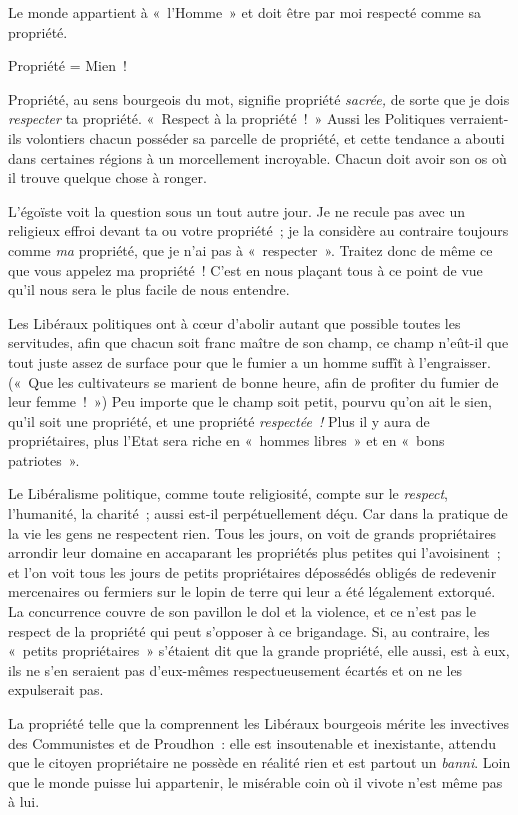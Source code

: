 \documentclass[french,twoside]{book} %
\begin{document}
Le monde appartient à « l’Homme » et doit être par moi respecté comme sa propriété.\par
Propriété = Mien !\par
Propriété, au sens bourgeois du mot, signifie propriété \emph{sacrée,} de sorte que je dois \emph{respecter} ta propriété. « Respect à la propriété ! » Aussi les Politiques verraient-ils volontiers chacun posséder sa parcelle de propriété, et cette tendance a abouti dans certaines régions à un morcellement incroyable. Chacun doit avoir son os où il trouve quelque chose à ronger.\par
L’égoïste voit la question sous un tout autre jour. Je ne recule pas avec un religieux effroi devant ta ou votre propriété ; je la considère au contraire toujours comme \emph{ma} propriété, que je n’ai pas à « respecter ». Traitez donc de même ce que vous appelez ma propriété ! C’est en nous plaçant tous à ce point de vue qu’il nous sera le plus facile de nous entendre.\par
 Les Libéraux politiques ont à cœur d’abolir autant que possible toutes les servitudes, afin que chacun soit franc maître de son champ, ce champ n’eût-il que tout juste assez de surface pour que le fumier a un homme suffît à l’engraisser. (« Que les cultivateurs se marient de bonne heure, afin de profiter du fumier de leur femme ! ») Peu importe que le champ soit petit, pourvu qu’on ait le sien, qu’il soit une propriété, et une propriété \emph{respectée !} Plus il y aura de propriétaires, plus l’Etat sera riche en « hommes libres » et en « bons patriotes ».\par
Le Libéralisme politique, comme toute religiosité, compte sur le \emph{respect}, l’humanité, la charité ; aussi est-il perpétuellement déçu. Car dans la pratique de la vie les gens ne respectent rien. Tous les jours, on voit de grands propriétaires arrondir leur domaine en accaparant les propriétés plus petites qui l’avoisinent ; et l’on voit tous les jours de petits propriétaires dépossédés obligés de redevenir mercenaires ou fermiers sur le lopin de terre qui leur a été légalement extorqué. La concurrence couvre de son pavillon le dol et la violence, et ce n’est pas le respect de la propriété qui peut s’opposer à ce brigandage. Si, au contraire, les « petits propriétaires » s’étaient dit que la grande propriété, elle aussi, est à eux, ils ne s’en seraient pas d’eux-mêmes respectueusement écartés et on ne les expulserait pas.\par
La propriété telle que la comprennent les Libéraux bourgeois mérite les invectives des Communistes et de Proudhon : elle est insoutenable et inexistante, attendu que le citoyen propriétaire ne possède en réalité rien et est partout un \emph{banni}. Loin que le monde puisse lui appartenir, le misérable coin où il vivote n’est même pas à lui.\par
\end{document}
